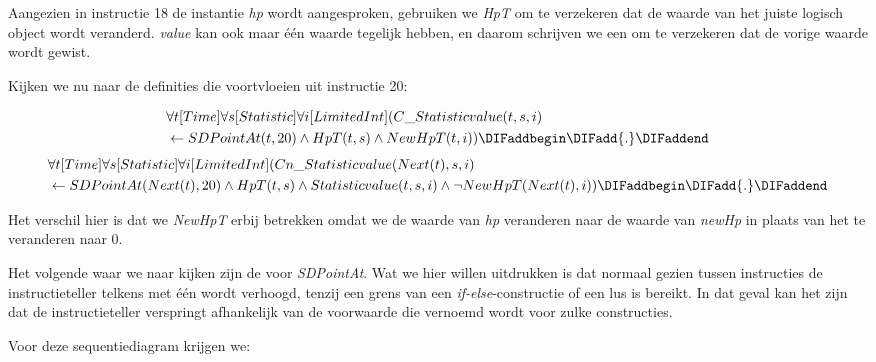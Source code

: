 Aangezien in instructie 18 de instantie \textit{hp} wordt aangesproken, gebruiken we \textit{HpT} om te verzekeren dat de waarde van het juiste logisch object wordt veranderd. \textit{value} kan ook maar \'e\'en waarde tegelijk hebben, en daarom schrijven we een \DIFdelbegin \textit{}%
\DIFdelend \DIFaddbegin {}\DIFaddend om te verzekeren dat de vorige waarde wordt gewist.

Kijken we nu naar de definities die voortvloeien uit instructie 20:

\begin{align*}
	&\forall{t}[Time]\forall{s}[Statistic]\forall{i}[LimitedInt](C\_Statisticvalue(t, s, i) \\ &\leftarrow SDPointAt(t, 20) \land HpT(t, s) \land NewHpT(t, i))\DIFaddbegin \DIFadd{.
}\DIFaddend \end{align*}
\begin{align*}
&\forall{t}[Time]\forall{s}[Statistic]\forall{i}[LimitedInt](Cn\_Statisticvalue(Next(t), s, i) \\ &\leftarrow SDPointAt(Next(t), 20) \land HpT(t, s) \land Statisticvalue(t, s, i) \land \lnot{}NewHpT(Next(t), i))\DIFaddbegin \DIFadd{.
}\DIFaddend \end{align*}

Het verschil hier is dat we \textit{NewHpT} erbij betrekken omdat we de waarde van \textit{hp} veranderen naar de waarde van \textit{newHp} in plaats van het te veranderen naar 0.

\parbreak

Het volgende waar we naar kijken zijn de \DIFdelbegin \textit{}%
\DIFdelend \DIFaddbegin {}\DIFaddend voor \textit{SDPointAt}. Wat we hier willen uitdrukken is dat normaal gezien tussen instructies de instructieteller telkens met \'e\'en wordt verhoogd, tenzij een grens van een \textit{if-else}-constructie of een lus is bereikt. In dat geval kan het zijn dat de instructieteller verspringt afhankelijk van de voorwaarde die vernoemd wordt voor zulke constructies.

Voor deze sequentiediagram krijgen we:

